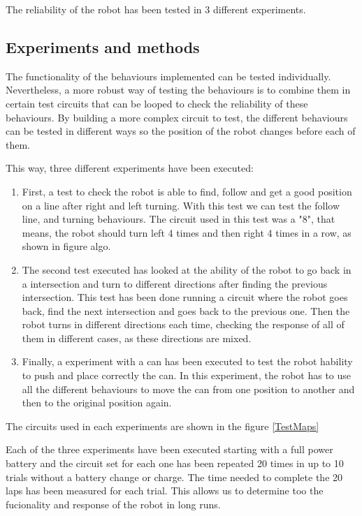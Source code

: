 
The reliability of the robot has been tested in 3 different experiments.

\subsection{Experiments and methods}

The functionality of the behaviours implemented can be tested individually.
Nevertheless, a more robust way of testing the behaviours is to combine them in certain test circuits that can be looped to check the reliability of these behaviours.
By building a more complex circuit to test, the different behaviours can be tested in different ways so the position of the robot changes before each of them.

This way, three different experiments have been executed:

\begin{enumerate}
	\item First, a test to check the robot is able to find, follow and get a good position on a line after right and left turning. 
With this test we can test the follow line, and turning behaviours.
The circuit used in this test was a "8", that means, the robot should turn left 4 times and then right 4 times in a row, 
as shown in figure algo.

	\item The second test executed has looked at the ability of the robot to go back in a intersection and turn to different directions after finding the previous intersection.
This test has been done running a circuit where the robot goes back, find the next intersection and goes back to the previous one. 
Then the robot turns in different directions each time, checking the response of all of them in different cases, as these directions are mixed.

	\item Finally, a experiment with a can has been executed to test the robot hability to push and place correctly the can.
In this experiment, the robot has to use all the different behaviours to move the can from one position to another and then to the original position again.

\end{enumerate}

The circuits used in each experiments are shown in the figure \ref{TestMaps}

Each of the three experiments have been executed starting with a full power battery and the circuit set for each one has been repeated 20 times in up to 10 trials without a battery change or charge.
The time needed to complete the 20 laps has been measured for each trial.
This allows us to determine too the fucionality and response of the robot in long runs.

